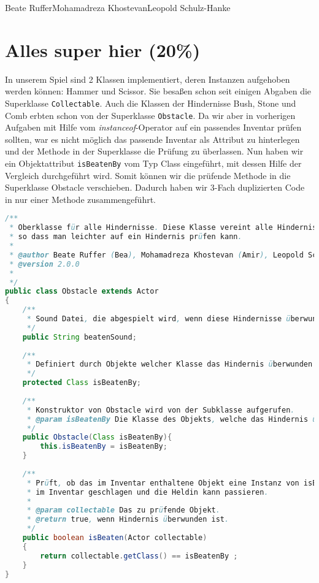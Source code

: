 \documentclass{pi1}
\begin{document}
		{Beate Ruffer}{Mohamadreza Khostevan}{Leopold Schulz-Hanke}

\section{Alles super hier (20\%)}
In unserem Spiel sind 2 Klassen implementiert, deren Instanzen aufgehoben werden können: Hammer und Scissor. Sie besaßen schon seit einigen Abgaben die Superklasse \texttt{Collectable}. Auch die Klassen der Hindernisse Bush, Stone und Comb erbten schon von der Superklasse \texttt{Obstacle}. Da wir aber in vorherigen Aufgaben mit Hilfe vom \emph{instanceof}-Operator auf ein passendes Inventar prüfen sollten, war es nicht möglich das passende Inventar als Attribut zu hinterlegen und der Methode in der Superklasse die Prüfung zu überlassen. Nun haben wir ein Objektattribut \texttt{isBeatenBy} vom Typ Class eingeführt, mit dessen Hilfe der Vergleich durchgeführt wird. Somit können wir die prüfende Methode in die Superklasse Obstacle verschieben. Dadurch haben wir 3-Fach duplizierten Code in nur einer Methode zusammengeführt.

\begin{lstlisting}[caption={Klasse \emph{Obstacle}}, firstnumber=3, language=Java]
/**
 * Oberklasse für alle Hindernisse. Diese Klasse vereint alle Hindernisse,
 * so dass man leichter auf ein Hindernis prüfen kann.
 * 
 * @author Beate Ruffer (Bea), Mohamadreza Khostevan (Amir), Leopold Schulz-Hanke (Leo) 
 * @version 2.0.0
 * 
 */
public class Obstacle extends Actor
{   
    /**
     * Sound Datei, die abgespielt wird, wenn diese Hindernisse überwunden wurden.
     */
    public String beatenSound;
    
    /**
     * Definiert durch Objekte welcher Klasse das Hindernis überwunden werden kann
     */
    protected Class isBeatenBy;
    
    /**
     * Konstruktor von Obstacle wird von der Subklasse aufgerufen.
     * @param isBeatenBy Die Klasse des Objekts, welche das Hindernis überwinden kann.
     */
    public Obstacle(Class isBeatenBy){
        this.isBeatenBy = isBeatenBy;
    }
    
    /**
     * Prüft, ob das im Inventar enthaltene Objekt eine Instanz von isBeatenBy ist. Falls ja, wird das Hindernis von dem Objekt
     * im Inventar geschlagen und die Heldin kann passieren.
     * 
     * @param collectable Das zu prüfende Objekt.
     * @return true, wenn Hindernis überwunden ist.
     */
    public boolean isBeaten(Actor collectable)
    {
        return collectable.getClass() == isBeatenBy ;
    }
}

\end{lstlisting}
\end{document}

